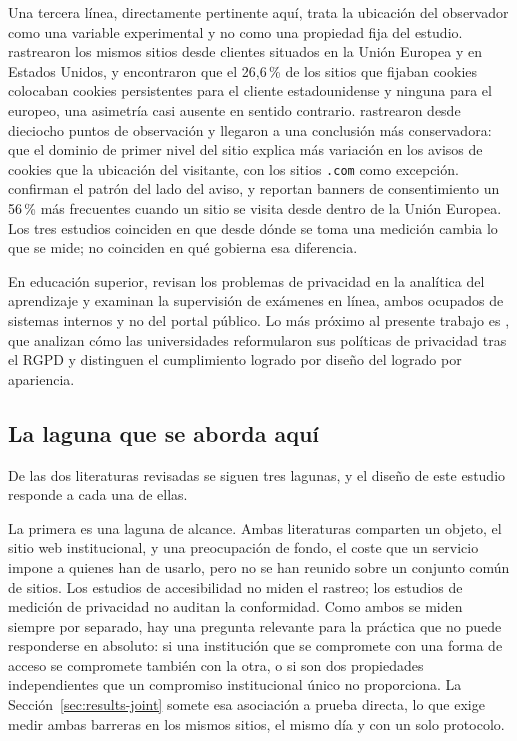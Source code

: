 \documentclass[pdflatex,sn-basic,Numbered,iicol]{sn-jnl}
\theoremstyle{thmstyleone}
\theoremstyle{thmstyletwo}
\theoremstyle{thmstylethree}
\begin{document}
Una tercera l\'inea, directamente pertinente aqu\'i, trata la ubicaci\'on del observador como una variable experimental y no como una propiedad fija del estudio. \citet{dabrowski2019measuring} rastrearon los mismos sitios desde clientes situados en la Uni\'on Europea y en Estados Unidos, y encontraron que el 26,6\,\% de los sitios que fijaban cookies colocaban cookies persistentes para el cliente estadounidense y ninguna para el europeo, una asimetr\'ia casi ausente en sentido contrario. \citet{vaneijk2019impact} rastrearon desde dieciocho puntos de observaci\'on y llegaron a una conclusi\'on m\'as conservadora: que el dominio de primer nivel del sitio explica m\'as variaci\'on en los avisos de cookies que la ubicaci\'on del visitante, con los sitios \texttt{.com} como excepci\'on. \citet{rasaii2023exploring} confirman el patr\'on del lado del aviso, y reportan banners de consentimiento un 56\,\% m\'as frecuentes cuando un sitio se visita desde dentro de la Uni\'on Europea. Los tres estudios coinciden en que desde d\'onde se toma una medici\'on cambia lo que se mide; no coinciden en qu\'e gobierna esa diferencia.

En educaci\'on superior, \citet{liu2023understanding} revisan los problemas de privacidad en la anal\'itica del aprendizaje y \citet{mutimukwe2026privacy} examinan la supervisi\'on de ex\'amenes en l\'inea, ambos ocupados de sistemas internos y no del portal p\'ublico. Lo m\'as pr\'oximo al presente trabajo es \citet{munot2025compliance}, que analizan c\'omo las universidades reformularon sus pol\'iticas de privacidad tras el RGPD y distinguen el cumplimiento logrado por dise\~no del logrado por apariencia.

\subsection{La laguna que se aborda aqu\'i}\label{sec:related-gap}

De las dos literaturas revisadas se siguen tres lagunas, y el dise\~no de este estudio responde a cada una de ellas.

La primera es una laguna de alcance. Ambas literaturas comparten un objeto, el sitio web institucional, y una preocupaci\'on de fondo, el coste que un servicio impone a quienes han de usarlo, pero no se han reunido sobre un conjunto com\'un de sitios. Los estudios de accesibilidad no miden el rastreo; los estudios de medici\'on de privacidad no auditan la conformidad. Como ambos se miden siempre por separado, hay una pregunta relevante para la pr\'actica que no puede responderse en absoluto: si una instituci\'on que se compromete con una forma de acceso se compromete tambi\'en con la otra, o si son dos propiedades independientes que un compromiso institucional \'unico no proporciona. La Secci\'on~\ref{sec:results-joint} somete esa asociaci\'on a prueba directa, lo que exige medir ambas barreras en los mismos sitios, el mismo d\'ia y con un solo protocolo.
\end{document}
